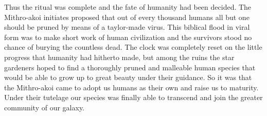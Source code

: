 \documentclass[12pt]{article}
\begin{document}
Thus the ritual was complete and the fate of humanity had been decided.
The Mithro-akoi initiates proposed that out of every thousand humans all but one should be pruned by means of a taylor-made virus.
This biblical flood in viral form was to make short work of human civilization 
and the survivors stood no chance of burying the countless dead. 
The clock was completely reset on the little progress that humanity had hitherto made,
but among the ruins the star gardeners hoped to find a thoroughly pruned and malleable human species that would be able to grow up to great beauty under their guidance.
So it was that the Mithro-akoi came to adopt us humans as their own and raise us to maturity.
Under their tutelage our species was finally able to transcend and join the greater community of our galaxy.
\end{document}
